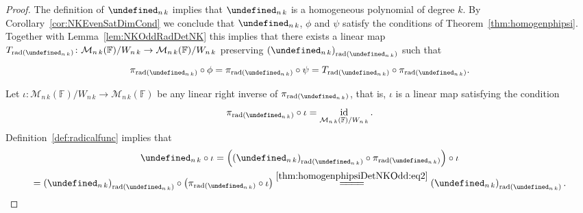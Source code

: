 \documentclass{elsarticle}
\let\det\undefined
\DeclareMathOperator{\det}{det}
\DeclareMathOperator{\id}{id}
\DeclareMathOperator{\rad}{rad}
\def\F{{\mathbb F}}
\def\M{{\mathcal M}}
\theoremstyle{definition}
\numberwithin{equation}{section}
\begin{document}
\begin{proof}
The definition of $\det_{n\,k}$ implies that $\det_{n\,k}$ is a homogeneous polynomial of degree $k$. By Corollary~\ref{cor:NKEvenSatDimCond} we conclude that $\det_{n\,k}$, $\phi$ and $\psi$ satisfy the conditions of Theorem~\ref{thm:homogenphipsi}. Together with Lemma~\ref{lem:NKOddRadDetNK} this implies that there exists a linear map $T_{\rad (\det_{n\,k})} \colon \M_{n\,k}(\F)/W_{n\,k} \to \M_{n\,k}(\F)/W_{n\,k}$ preserving $\left(\det_{n\,k}\right)_{\rad (\det_{n\,k})}$ such that 
\begin{equation}\label{thm:homogenphipsiDetNKOdd:eq1}
\pi_{\rad (\det_{n\,k})} \circ \phi = \pi_{\rad (\det_{n\,k})} \circ \psi = T_{\rad (\det_{n\,k})} \circ \pi_{\rad (\det_{n\,k})}. 
\end{equation}

Let $\iota \colon \M_{n\,k}(\F)/W_{n\,k} \to \M_{n\,k}(\F)$ be any linear right inverse of $\pi_{\rad (\det_{n\,k})}$, that is, $\iota$ is a linear map satisfying the condition
\begin{equation}\label{thm:homogenphipsiDetNKOdd:eq2}
\pi_{\rad (\det_{n\,k})} \circ \iota = \id_{\M_{n\,k}(\F)/W_{n\,k}}.
\end{equation}
Definition~\ref{def:radicalfunc} implies that
\begin{multline}\label{thm:homogenphipsiDetNKOdd:eq3}
\det_{n\,k} \circ \iota = \left(\left(\det_{n\,k}\right)_{\rad (\det_{n\,k})} \circ \pi_{\rad (\det_{n\,k})}\right) \circ \iota\\
= \left(\det_{n\,k}\right)_{\rad (\det_{n\,k})} \circ \left(\pi_{\rad (\det_{n\,k})} \circ \iota\right)\overset{\eqref{thm:homogenphipsiDetNKOdd:eq2}}{=\joinrel=\joinrel=\joinrel=} \left(\det_{n\,k}\right)_{\rad (\det_{n\,k})}.
\end{multline}


\end{proof}
\end{document}
